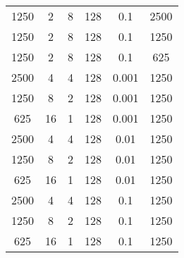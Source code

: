\begin{tabularx}{\linewidth}{ |c|c|c|c|c|c|  }
    1250 & 2   & 8     & 128 & 0.1   & 2500                                                                                                                               \\
    1250 & 2   & 8     & 128 & 0.1   & 1250                                                                                                                               \\
    1250 & 2   & 8     & 128 & 0.1   & 625                                                                                                                                \\
    2500 & 4   & 4     & 128 & 0.001 & 1250                                                                                                                               \\
    1250 & 8   & 2     & 128 & 0.001 & 1250                                                                                                                               \\
    625  & 16  & 1     & 128 & 0.001 & 1250                                                                                                                               \\
    2500 & 4   & 4     & 128 & 0.01  & 1250                                                                                                                               \\
    1250 & 8   & 2     & 128 & 0.01  & 1250                                                                                                                               \\
    625  & 16  & 1     & 128 & 0.01  & 1250                                                                                                                               \\
    2500 & 4   & 4     & 128 & 0.1   & 1250                                                                                                                               \\
    1250 & 8   & 2     & 128 & 0.1   & 1250                                                                                                                               \\
    625  & 16  & 1     & 128 & 0.1   & 1250                                                                                                                               \\
    \hline
\end{tabularx}

